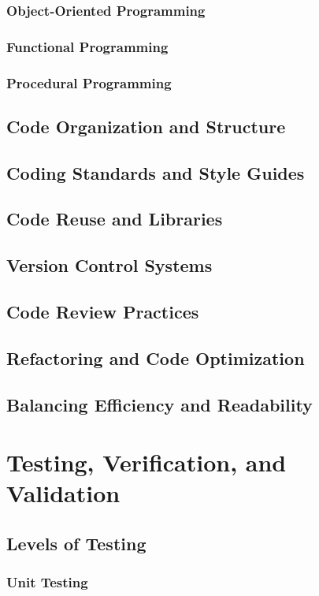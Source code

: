 \begin{refsection}
\subsubsection{Object-Oriented Programming}
\subsubsection{Functional Programming}
\subsubsection{Procedural Programming}
\subsection{Code Organization and Structure}
\subsection{Coding Standards and Style Guides}
\subsection{Code Reuse and Libraries}
\subsection{Version Control Systems}
\subsection{Code Review Practices}
\subsection{Refactoring and Code Optimization}
\subsection{Balancing Efficiency and Readability}

\newpage

\section{Testing, Verification, and Validation}
\subsection{Levels of Testing}
\subsubsection{Unit Testing}

\end{refsection}
